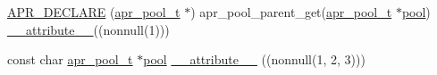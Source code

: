 \begin{DoxyCompactItemize}
\item 
\hyperlink{group__apr__pools_ga423b5a3ecdf41b53559f971f5777cbc4}{A\+P\+R\+\_\+\+D\+E\+C\+L\+A\+RE} (\hyperlink{structapr__pool__t}{apr\+\_\+pool\+\_\+t} $\ast$) apr\+\_\+pool\+\_\+parent\+\_\+get(\hyperlink{structapr__pool__t}{apr\+\_\+pool\+\_\+t} $\ast$\hyperlink{group__APR__XLATE_gabb3cd978f04c73d0b763c391e9bfde73}{pool}) \hyperlink{group__APR__Util__Bucket__Brigades_gae0af316ed59541b70389da41aaeef4b6}{\+\_\+\+\_\+attribute\+\_\+\+\_\+}((nonnull(1)))
\item 
const char \hyperlink{structapr__pool__t}{apr\+\_\+pool\+\_\+t} $\ast$\hyperlink{group__APR__XLATE_gabb3cd978f04c73d0b763c391e9bfde73}{pool} \hyperlink{group__apr__pools_ga8402402afc75175228d3d177681189b1}{\+\_\+\+\_\+attribute\+\_\+\+\_\+} ((nonnull(1, 2, 3)))
\end{DoxyCompactItemize}
